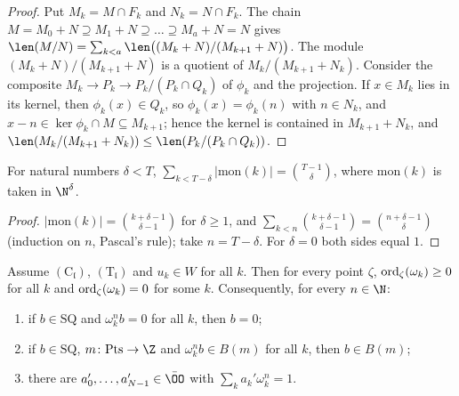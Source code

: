 \begin{proof}
Put $M_k=M\cap F_k$ and $N_k=N\cap F_k$. The chain $M=M_0+N\supseteq M_1+N\supseteq\dots\supseteq M_a+N=N$ gives
$\len(M/N)=\sum_{k<a}\len\bigl((M_k+N)/(M_{k+1}+N)\bigr)$. The module $(M_k+N)/(M_{k+1}+N)$ is a quotient of
$M_k/(M_{k+1}+N_k)$. Consider the composite $M_k\to P_k\to P_k/(P_k\cap Q_k)$ of $\phi_k$ and the projection. If $x\in M_k$
lies in its kernel, then $\phi_k(x)\in Q_k$, so $\phi_k(x)=\phi_k(n)$ with $n\in N_k$, and $x-n\in\ker\phi_k\cap M\subseteq
M_{k+1}$; hence the kernel is contained in $M_{k+1}+N_k$, and $\len(M_k/(M_{k+1}+N_k))\le\len(P_k/(P_k\cap Q_k))$.
\end{proof}

\begin{lemma}\label{pf:onto1:monos}
For natural numbers $\delta<T$, $\sum_{k<T-\delta}|\mathrm{mon}(k)|=\binom{T-1}{\delta}$, where $\mathrm{mon}(k)$ is taken in
$\N^\delta$.
\end{lemma}

\begin{proof}
$|\mathrm{mon}(k)|=\binom{k+\delta-1}{\delta-1}$ for $\delta\ge1$, and $\sum_{k<n}\binom{k+\delta-1}{\delta-1}=\binom{n+\delta-1}{\delta}$
(induction on $n$, Pascal's rule); take $n=T-\delta$. For $\delta=0$ both sides equal $1$.
\end{proof}

\begin{lemma}[Columns]\label{pf:onto1:columns}
Assume $(\mathrm C_{\mathfrak l})$, $(\mathrm T_{\mathfrak l})$ and $u_k\in W$ for all $k$. Then for every point $\zeta$,
$\operatorname{ord}_\zeta(\omega_k)\ge0$ for all $k$ and $\operatorname{ord}_\zeta(\omega_k)=0$ for some $k$. Consequently, for every $n\in\N$:
\begin{enumerate}[label=(\alph*)]
\item if $b\in\mathrm{SQ}$ and $\omega_k^nb=0$ for all $k$, then $b=0$;
\item if $b\in\mathrm{SQ}$, $m\colon\mathrm{Pts}\to\Z$ and $\omega_k^nb\in B(m)$ for all $k$, then $b\in B(m)$;
\item there are $a_0',\dots,a_{N-1}'\in\bar\OO$ with $\sum_ka_k'\omega_k^n=1$.
\end{enumerate}
\end{lemma}

